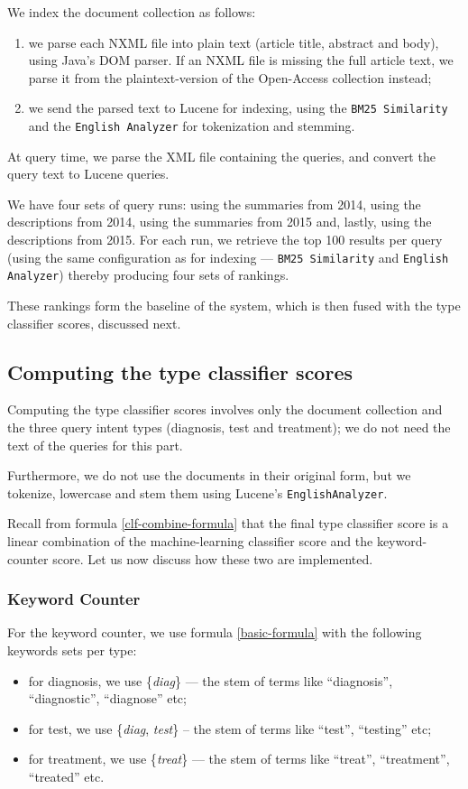 We index the document collection as follows:
\begin{enumerate}[label=\arabic*)]
 \item we parse each NXML file into plain text (article title, abstract and body), using Java's DOM parser.
  If an NXML file is missing the full article text, we parse it from the plaintext-version of the Open-Access collection instead;
 \item we send the parsed text to Lucene for indexing,
    using the \texttt{BM25 Similarity} and the \texttt{English Analyzer} for tokenization and stemming.
\end{enumerate}

At query time, we parse the XML file containing the queries, and convert the query text to Lucene queries.

We have four sets of query runs: using the summaries from 2014, using the descriptions from 2014, using the summaries from 2015 and,
lastly, using the descriptions from 2015. 
For each run, we retrieve the top 100 results per query
(using the same configuration as for indexing --- \texttt{BM25 Similarity} and \texttt{English Analyzer})
thereby producing four sets of rankings.

These rankings form the baseline of the system, which is then fused
with the type classifier scores, discussed next.

\subsection{Computing the type classifier scores}
Computing the type classifier scores involves only the document collection and the three query intent types (diagnosis, test and treatment);
we do not need the text of the queries for this part. 

Furthermore, we do not use the documents in their original form,
but we tokenize, lowercase and stem them using Lucene's \texttt{EnglishAnalyzer}.

Recall from formula \ref{clf-combine-formula} that the final type classifier score is a linear combination of the 
machine-learning classifier score and the keyword-counter score. Let us now discuss how these two are implemented.

\subsubsection{Keyword Counter}
For the keyword counter, we use formula \ref{basic-formula} with the following keywords sets per type:
\begin{itemize}
 \item for diagnosis, we use \{\emph{diag}\} --- the stem of terms like ``diagnosis'', ``diagnostic'', ``diagnose'' etc;
 \item for test, we use \{\emph{diag}, \emph{test}\} -- the stem of terms like ``test'', ``testing'' etc;
 \item for treatment, we use \{\emph{treat}\} --- the stem of terms like ``treat'', ``treatment'', ``treated'' etc.
\end{itemize}

